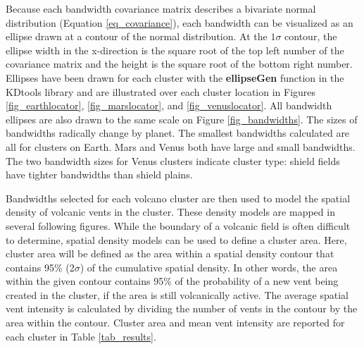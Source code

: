 Because each bandwidth covariance matrix describes a bivariate normal distribution (Equation \ref{eq_covariance}), each bandwidth can be visualized as an ellipse drawn at a contour of the normal distribution. At the $1\sigma$ contour, the ellipse width in the x-direction is the square root of the top left number of the covariance matrix and the height is the square root of the bottom right number. Ellipses have been drawn for each cluster with the \textbf{ellipseGen} function in the KDtools library and are illustrated over each cluster location in Figures \ref{fig_earthlocator}, \ref{fig_marslocator}, and \ref{fig_venuslocator}. All bandwidth ellipses are also drawn to the same scale on Figure \ref{fig_bandwidths}. The sizes of bandwidths radically change by planet. The smallest bandwidths calculated are all for clusters on Earth. Mars and Venus both have large and small bandwidths. The two bandwidth sizes for Venus clusters indicate cluster type: shield fields have tighter bandwidths than shield plains.

Bandwidths selected for each volcano cluster are then used to model the spatial density of volcanic vents in the cluster. These density models are mapped in several following figures. While the boundary of a volcanic field is often difficult to determine, spatial density models can be used to define a cluster area. Here, cluster area will be defined as the area within a spatial density contour that contains 95\% (2$\sigma$) of the cumulative spatial density. In other words, the area within the given contour contains 95\% of the probability of a new vent being created in the cluster, if the area is still volcanically active. The average spatial vent intensity is calculated by dividing the number of vents in the contour by the area within the contour. Cluster area and mean vent intensity are reported for each cluster in Table \ref{tab_results}.

